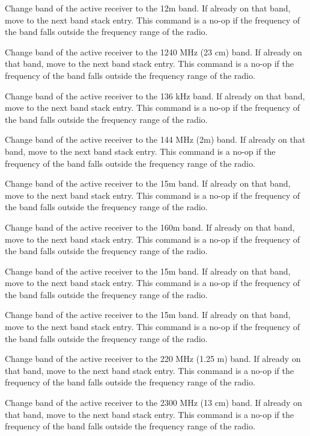 \documentclass[12pt]{book}
\begin{document}
{Change band of the active receiver to the 12m band. If already on that band, move to
the next band stack entry. This command is a no-op if the frequency of the band falls outside the frequency range
of the radio.}

{Change band of the active receiver to the 1240 MHz (23 cm) band. If already on that band, move to
the next band stack entry. This command is a no-op if the frequency of the band falls outside the frequency
range of the radio.}

{Change band of the active receiver to the 136 kHz
band. If already on that band, move to the next band stack entry.
This command is a no-op if the frequency of the band falls outside the frequency
range of the radio.}

{Change band of the active receiver to the 144 MHz (2m) band. If already on that band, move to
the next band stack entry. This command is a no-op if the frequency of the band falls outside the frequency
range of the radio.}

{Change band of the active receiver to the 15m band. If already on that band, move to
the next band stack entry. This command is a no-op if the frequency of the band falls outside the frequency
range of the radio.}

{Change band of the active receiver to the 160m band. If already on that band, move to
the next band stack entry. This command is a no-op if the frequency of the band falls outside the frequency
range of the radio.}

{Change band of the active receiver to the 15m band. If already on that band, move to
the next band stack entry. This command is a no-op if the frequency of the band falls outside the frequency
range of the radio.}

{Change band of the active receiver to the 15m band. If already on that band, move to
the next band stack entry. This command is a no-op if the frequency of the band falls outside the frequency
range of the radio.}

{Change band of the active receiver to the 220 MHz (1.25 m) band. If already on that band, move to
the next band stack entry. This command is a no-op if the frequency of the band falls outside the frequency
range of the radio.}

{Change band of the active receiver to the 2300 MHz (13 cm) band. If already on that band, move to
the next band stack entry. This command is a no-op if the frequency of the band falls outside the frequency
range of the radio.}
\end{document}
